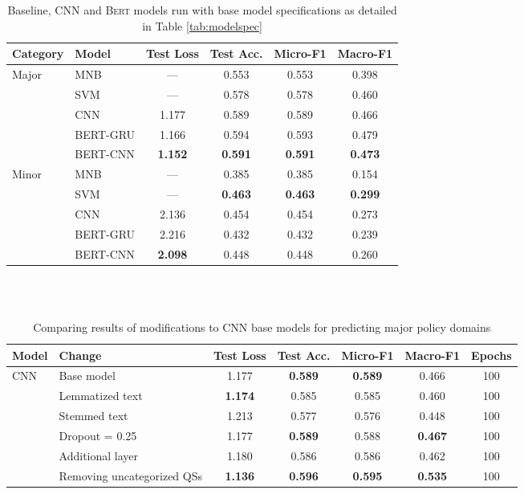 \documentclass[11pt]{article}
\begin{document}
\begin{table}[htbp]
  \centering
    \begin{tabular}{llcccc}
    \toprule
    Category & Model & Test Loss  & Test Acc. & Micro-F1 & Macro-F1 \\
    \midrule
    \multirow{5}[2]{*}{Major} & MNB   &   ---  & 0.553 & 0.553 & 0.398 \\
          & SVM   &   ---  & 0.578 & 0.578 & 0.460 \\
          & CNN   & 1.177 & 0.589 & 0.589 & 0.466 \\
          & BERT-GRU & 1.166 & 0.594 & 0.593 & 0.479 \\
          & BERT-CNN & \textbf{1.152} & \textbf{0.591} & \textbf{0.591} & \textbf{0.473} \\
    \midrule
    \multirow{5}[1]{*}{Minor} & MNB   &   ---  & 0.385 & 0.385 & 0.154 \\
          & SVM   &   ---  & \textbf{0.463} & \textbf{0.463} & \textbf{0.299} \\
          & CNN   & 2.136 & 0.454 & 0.454 & 0.273 \\
          & BERT-GRU & 2.216 & 0.432 & 0.432 & 0.239 \\
          & BERT-CNN & \textbf{2.098} & 0.448 & 0.448 & 0.260 \\
    \bottomrule
    \end{tabular} \\~\\
    \caption{Baseline, CNN and \textsc{Bert} models run with base model specifications as detailed in Table \ref{tab:modelspec}}
  \label{tab:modelresults}%
\end{table}%


\begin{table}[htbp]
  \centering
    \begin{tabular}{llccccc}
    \toprule
    Model & Change & Test Loss & Test Acc. & Micro-F1 & Macro-F1 & Epochs \\
    \midrule
    \multirow{6}[1]{*}{CNN} & Base model & 1.177 & \textbf{0.589} & \textbf{0.589} & 0.466 & 100 \\
          & Lemmatized text & \textbf{1.174} & 0.585 & 0.585 & 0.460 & 100 \\
          & Stemmed text & 1.213 & 0.577 & 0.576 & 0.448 & 100 \\
          & Dropout = 0.25 & 1.177 & \textbf{0.589} & 0.588 & \textbf{0.467} & 100 \\
          & Additional layer & 1.180  & 0.586 & 0.586 & 0.462 & 100 \\
          & Removing uncategorized QSs & \textbf{1.136} & \textbf{0.596} & \textbf{0.595} & \textbf{0.535} & 100 \\
    \bottomrule
    \end{tabular} \\~\\
  \caption{Comparing results of modifications to CNN base models for predicting major policy domains}
  \label{tab:CNNchange}%
\end{table}%
\end{document}

